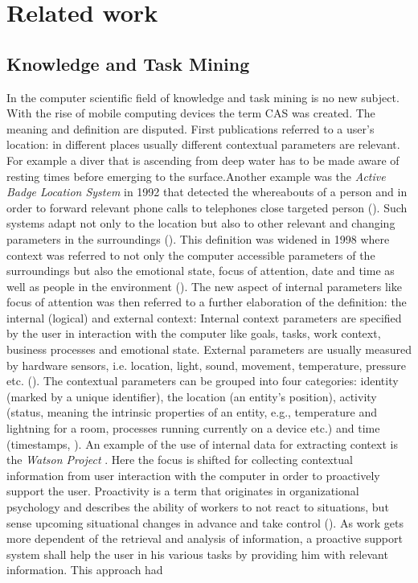 
\chapter{Related work}
\label{relatedwork}
\section{Knowledge and Task Mining}
In the computer scientific field of knowledge and task mining is no new subject. With the rise of mobile computing devices the term \ac{CAS} was created. The meaning and definition are disputed. First publications referred to a user's location: in different places usually different contextual parameters are relevant. For example a diver that is ascending from deep water has to be made aware of resting times before emerging to the surface.Another example was the \textit{Active Badge Location System} in 1992 that detected the whereabouts of a person and in order to forward relevant phone calls to telephones close targeted person (\cite{want1992active}). Such systems adapt not only to the location but also to other relevant and changing parameters in the surroundings (\cite{schilit1994context}). This definition was widened in 1998 where context was referred to not only the computer accessible parameters of the surroundings but also the emotional state, focus of attention, date and time as well as people in the environment (\cite{dey1998context}). The new aspect of internal parameters like focus of attention was then referred to a further elaboration of the definition: the internal (logical) and external context: Internal context parameters are specified by the user in interaction with the computer like goals, tasks, work context, business processes and emotional state. External parameters are usually measured by hardware sensors, i.e. location, light, sound, movement, temperature, pressure etc. (\cite{hofer2003context}). The contextual parameters can be grouped into four categories: identity (marked by a unique identifier), the location (an entity’s position), activity (status, meaning the intrinsic properties of an entity, e.g., temperature and lightning for a room, processes running currently on a device etc.) and time (timestamps, \cite{dey2001conceptual}). An example of the use of internal data for extracting context is the \textit{Watson Project} \cite{budzik2000user}. Here the focus is shifted for collecting contextual information from user interaction with the computer in order to proactively support the user. Proactivity is a term that  originates in organizational psychology and describes the ability of workers to not react to situations, but sense upcoming situational changes in advance and take control (\cite{grant2008dynamics}). As work gets more dependent of the retrieval and analysis of information, a proactive support system shall help the user in his various tasks by providing him with relevant information. This approach had 